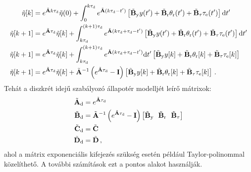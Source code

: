 \begin{align}
    \begin{split}
        \tilde{\mathbf{\eta}}[k] &= e^{\tilde {\mathbf{A}} k\tau_{\mathrm{d}}}\tilde{\mathbf{\eta}}(0) + \int_{0}^{k\tau_{\mathrm{d}}} e^{\tilde {\mathbf{A}} (k\tau_{\mathrm{d}}-t')}\left[\tilde{\mathbf{B}}_{\mathrm{y}} y(t') + 
        \tilde{\mathbf{B}}_{\mathrm{r}} \theta_{\mathrm{r}}(t') +
        \tilde{\mathbf{B}}_{\mathrm{\tau}} \tau_{\mathrm{e}}(t')\right]\mathrm{d}t' \\
        \tilde{\mathbf{\eta}}[k+1] &= e^{\tilde {\mathbf{A}}\tau_{\mathrm{d}}}\tilde{\mathbf{\eta}}[k] + \int_{k\tau_{\mathrm{d}}}^{(k+1)\tau_{\mathrm{d}}} e^{\tilde {\mathbf{A}} (k\tau_{\mathrm{d}} + \tau_{\mathrm{d}}-t')}\left[\tilde{\mathbf{B}}_{\mathrm{y}} y(t') + 
        \tilde{\mathbf{B}}_{\mathrm{r}} \theta_{\mathrm{r}}(t') +
        \tilde{\mathbf{B}}_{\mathrm{\tau}} \tau_{\mathrm{e}}(t')\right] \mathrm{d}t' \\
        \tilde{\mathbf{\eta}}[k+1] &= e^{\tilde {\mathbf{A}}\tau_{\mathrm{d}}}\tilde{\mathbf{\eta}}[k] + \int_{k\tau_{\mathrm{d}}}^{(k+1)\tau_{\mathrm{d}}} e^{\tilde {\mathbf{A}} (k\tau_{\mathrm{d}} + \tau_{\mathrm{d}}-t')}\mathrm{d}t'\left[\tilde{\mathbf{B}}_{\mathrm{y}} y[k] + 
        \tilde{\mathbf{B}}_{\mathrm{r}} \theta_{\mathrm{r}}[k] +
        \tilde{\mathbf{B}}_{\mathrm{\tau}} \tau_{\mathrm{e}}[k]\right] \\
        \tilde{\mathbf{\eta}}[k+1] &= e^{\tilde {\mathbf{A}}\tau_{\mathrm{d}}}\tilde{\mathbf{\eta}}[k] + \tilde{\mathbf{A}}^{-1}\left(e^{\tilde {\mathbf{A}}\tau_{\mathrm{d}}}-\mathbf{I}\right)\left[\tilde{\mathbf{B}}_{\mathrm{y}} y[k] + 
        \tilde{\mathbf{B}}_{\mathrm{r}} \theta_{\mathrm{r}}[k] +
        \tilde{\mathbf{B}}_{\mathrm{\tau}} \tau_{\mathrm{e}}[k]\right]\,.
    \end{split}        
\end{align}
Tehát a diszkrét idejű szabályozó állapotér modelljét leírő mátrixok:
\begin{align}\label{eq:discrete_controller_matrices}
    \begin{split}
        \tilde{\mathbf{A}}_{\mathrm{d}} &= e^{\tilde {\mathbf{A}}\tau_{\mathrm{d}}} \\
        \tilde{\mathbf{B}}_{\mathrm{d}} &= \tilde{\mathbf{A}}^{-1}\left(e^{\tilde {\mathbf{A}}\tau_{\mathrm{d}}}-\mathbf{I}\right)\left[\tilde{\mathbf{B}}_{\mathrm{y}}~~\tilde{\mathbf{B}}_{\mathrm{r}}~~\tilde{\mathbf{B}}_{\mathrm{\tau}}\right] \\
        \tilde{\mathbf{C}}_{\mathrm{d}} &= \tilde{\mathbf{C}} \\
        \tilde{\mathbf{D}}_{\mathrm{d}} &= \tilde{\mathbf{D}} \,,
    \end{split}        
\end{align}
ahol a mátrix exponenciális kifejezés szükség esetén például Taylor-polinommal közelíthető. A további számítások ezt 
a pontos alakot használják.

